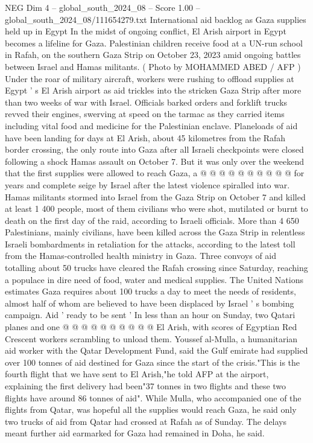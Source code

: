 \begin{textsample}{NEG Dim 4 – global\_south\_2024\_08 – Score 1.00 – global\_south\_2024\_08/111654279.txt}  \label{ex:f4_neg_335}
International aid backlog as Gaza supplies held up in Egypt In the midst of ongoing conflict, El Arish airport in Egypt becomes a lifeline for Gaza.
Palestinian children receive food at a UN-run school in Rafah, on the southern Gaza Strip on October 23, 2023 amid ongoing battles between Israel and Hamas militants. ( Photo by MOHAMMED ABED / AFP ) Under the roar of military aircraft, workers were rushing to offload supplies at Egypt ' s El Arish airport as aid trickles into the stricken Gaza Strip after more than two weeks of war with Israel.
Officials barked orders and forklift trucks revved their engines, swerving at speed on the tarmac as they carried items including vital food and medicine for the Palestinian enclave.
Planeloads of aid have been landing for days at El Arish, about 45 kilometres from the Rafah border crossing, the only route into Gaza after all Israeli checkpoints were closed following a shock Hamas assault on October 7.
But it was only over the weekend that the first supplies were allowed to reach Gaza, a @ @ @ @ @ @ @ @ @ @ for years and complete seige by Israel after the latest violence spiralled into war.
Hamas militants stormed into Israel from the Gaza Strip on October 7 and killed at least 1 400 people, most of them civilians who were shot, mutilated or burnt to death on the first day of the raid, according to Israeli officials.
More than 4 650 Palestinians, mainly civilians, have been killed across the Gaza Strip in relentless Israeli bombardments in retaliation for the attacks, according to the latest toll from the Hamas-controlled health ministry in Gaza.
Three convoys of aid totalling about 50 trucks have cleared the Rafah crossing since Saturday, reaching a populace in dire need of food, water and medical supplies.
The United Nations estimates Gaza requires about 100 trucks a day to meet the needs of residents, almost half of whom are believed to have been displaced by Israel ' s bombing campaign.
Aid ' ready to be sent ' In less than an hour on Sunday, two Qatari planes and one @ @ @ @ @ @ @ @ @ @ El Arish, with scores of Egyptian Red Crescent workers scrambling to unload them.
Youssef al-Mulla, a humanitarian aid worker with the Qatar Development Fund, said the Gulf emirate had supplied over 100 tonnes of aid destined for Gaza since the start of the crisis."This is the fourth flight that we have sent to El Arish,"he told AFP at the airport, explaining the first delivery had been"37 tonnes in two flights and these two flights have around 86 tonnes of aid".
While Mulla, who accompanied one of the flights from Qatar, was hopeful all the supplies would reach Gaza, he said only two trucks of aid from Qatar had crossed at Rafah as of Sunday.
The delays meant further aid earmarked for Gaza had remained in Doha, he said.

\end{textsample}
